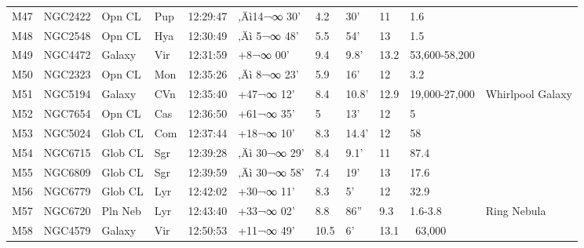 \documentclass[10pt,twoside,a4paper,english]{report}
\begin{document}
\begin{longtable}{@{}lllllllllll@{}}
M47        & NGC2422     & Opn CL     & Pup       & 12:29:47 & ‚Äì14¬∞ 30'  & 4.2       & 30'                  & 11       & 1.6                 &                                           \\ 
M48        & NGC2548     & Opn CL     & Hya       & 12:30:49 & ‚Äì 5¬∞ 48'  & 5.5       & 54'                  & 13       & 1.5                 &                                           \\ 
M49        & NGC4472     & Galaxy     & Vir       & 12:31:59 & +8¬∞ 00'   & 9.4       & 9.8'                 & 13.2     & 53,600-58,200       &                                           \\ 
M50        & NGC2323     & Opn CL     & Mon       & 12:35:26 & ‚Äì 8¬∞ 23'  & 5.9       & 16'                  & 12       & 3.2                 &                                           \\ 
M51        & NGC5194     & Galaxy     & CVn       & 12:35:40 & +47¬∞ 12'  & 8.4       & 10.8'                & 12.9     & 19,000-27,000       & Whirlpool Galaxy                          \\ 
M52        & NGC7654     & Opn CL     & Cas       & 12:36:50 & +61¬∞ 35'  & 5         & 13'                  & 12       & 5                   &                                           \\ 
M53        & NGC5024     & Glob CL    & Com       & 12:37:44 & +18¬∞ 10'  & 8.3       & 14.4'                & 12       & 58                  &                                           \\ 
M54        & NGC6715     & Glob CL    & Sgr       & 12:39:28 & ‚Äì 30¬∞ 29' & 8.4       & 9.1'                 & 11       & 87.4                &                                           \\ 
M55        & NGC6809     & Glob CL    & Sgr       & 12:39:59 & ‚Äì 30¬∞ 58' & 7.4       & 19'                  & 13       & 17.6                &                                           \\ 
M56        & NGC6779     & Glob CL    & Lyr       & 12:42:02 & +30¬∞ 11'  & 8.3       & 5'                   & 12       & 32.9                &                                           \\ 
M57        & NGC6720     & Pln Neb    & Lyr       & 12:43:40 & +33¬∞ 02'  & 8.8       & 86''                 & 9.3      & 1.6-3.8             & Ring Nebula                               \\ 
M58        & NGC4579     & Galaxy     & Vir       & 12:50:53 & +11¬∞ 49'  & 10.5      & 6'                   & 13.1     & ~63,000             &                                           \\ 

\end{longtable}
\end{document}
